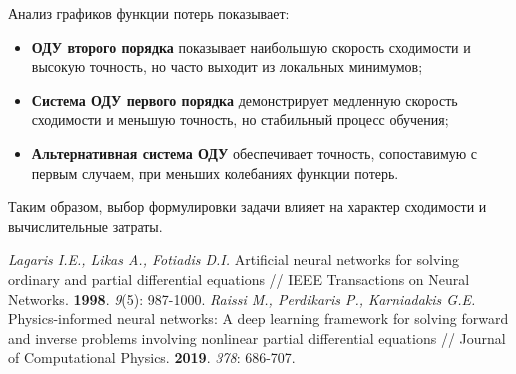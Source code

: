 \documentclass[oneside, a5paper,10pt]{article}
\begin{document}
{Анализ графиков функции потерь показывает:
\begin{itemize}
    \item \textbf{ОДУ второго порядка} показывает наибольшую скорость сходимости и высокую точность, но часто выходит из локальных минимумов;
    \item \textbf{Система ОДУ первого порядка} демонстрирует медленную скорость сходимости и меньшую точность, но стабильный процесс обучения;
    \item \textbf{Альтернативная система ОДУ} обеспечивает точность, сопоставимую с первым случаем, при меньших колебаниях функции потерь.
\end{itemize}

Таким образом, выбор формулировки задачи влияет на характер сходимости и вычислительные затраты.

\begin{thebibliography}{9}
     \textit{Lagaris I.E., Likas A., Fotiadis D.I.} Artificial neural networks for solving ordinary and partial differential equations // IEEE Transactions on Neural Networks. \textbf{1998}. \textit{9}(5): 987-1000.
     \textit{Raissi M., Perdikaris P., Karniadakis G.E.} Physics-informed neural networks: A deep learning framework for solving forward and inverse problems involving nonlinear partial differential equations // Journal of Computational Physics. \textbf{2019}. \textit{378}: 686-707.
\end{thebibliography}
}
\end{document}
